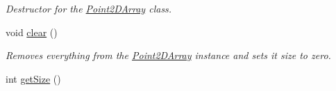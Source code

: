\begin{DoxyCompactItemize}
\begin{DoxyCompactList}\small\item\em Destructor for the \hyperlink{class_point2_d_array}{Point2\+D\+Array} class. \end{DoxyCompactList}\item 
\hypertarget{class_point2_d_array_a00b6c0b578d1c2e1023606e81b62d6de}{void \hyperlink{class_point2_d_array_a00b6c0b578d1c2e1023606e81b62d6de}{clear} ()}\label{class_point2_d_array_a00b6c0b578d1c2e1023606e81b62d6de}

\begin{DoxyCompactList}\small\item\em Removes everything from the \hyperlink{class_point2_d_array}{Point2\+D\+Array} instance and sets it size to zero. \end{DoxyCompactList}\item 
\hypertarget{class_point2_d_array_a2c82ee53be3f00e252f42a0622d24840}{int \hyperlink{class_point2_d_array_a2c82ee53be3f00e252f42a0622d24840}{get\+Size} ()}\label{class_point2_d_array_a2c82ee53be3f00e252f42a0622d24840}


\end{DoxyCompactItemize}
